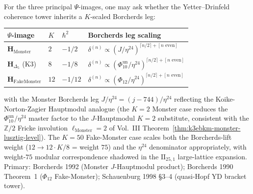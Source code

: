 \begin{remark}
\label{rem:dc-psi-yd-cosibling}
For the three principal \(\Psi\)-images, one may ask whether the
Yetter--Drinfeld coherence tower inherits a \(K\)-scaled Borcherds leg:
\begin{center}
\renewcommand{\arraystretch}{1.3}
\begin{tabular}{@{}llll@{}}
\toprule
$\Psi$-image & $K$ & $\hbar^2$ & Borcherds leg scaling \\
\midrule
$\mathbf H_{\mathrm{Monster}}$ & $2$ & $-1/2$ &
 $\delta^{(n)} \propto (J/\eta^{24})^{\lceil n/2\rceil + [n \text{ even}]}$ \\
$\mathbf H_{\Delta_5}$ (K3) & $8$ & $-1/8$ &
 $\delta^{(n)} \propto (\Phi_{10}^{\mathrm{un}}/\eta^{24})^{\lceil n/2\rceil + [n \text{ even}]}$ \\
$\mathbf H_{\mathrm{FakeMonster}}$ & $12$ & $-1/12$ &
 $\delta^{(n)} \propto (\Phi_{12}/\eta^{24})^{\lceil n/2\rceil + [n \text{ even}]}$ \\
\bottomrule
\end{tabular}
\end{center}
with the Monster Borcherds leg $J/\eta^{24} = (j - 744)/\eta^{24}$
reflecting the Koike-Norton-Zagier Hauptmodul analogue (the
$K = 2$ Monster case reduces the $\Phi_{10}^{\mathrm{un}}/\eta^{24}$ master factor
to the $J$-Hauptmodul $K = 2$ substitute, consistent with the
$\mathbb{Z}/2$ Fricke involution $\ell_{\mathrm{Monster}} = 2$ of
Vol.~III Theorem~\ref{thm:k3ebkm-monster-lusztig-level}). The
$K = 50$ Fake-Monster case scales both the Borcherds-lift weight
($12 \to 12\cdot K/8$ = weight $75$) and the $\eta^{24}$ denominator
appropriately, with weight-$75$ modular correspondence shadowed in
the $\mathrm{II}_{25,1}$ large-lattice expansion. Primary:
Borcherds 1992 (Monster $J$-Hauptmodul product);
Borcherds 1990 Theorem~1 ($\Phi_{12}$ Fake-Monster);
Schauenburg 1998 \S3--4 (quasi-Hopf YD bracket tower).
\end{remark}

